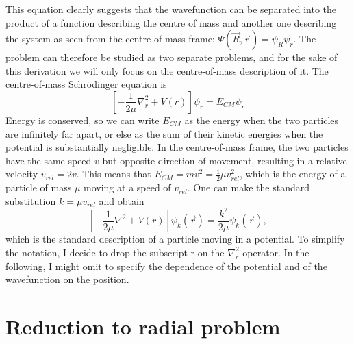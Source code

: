 This equation clearly suggests that the wavefunction can be separated into the product of a function describing the centre of mass and another one describing the system as seen from the centre-of-mass frame: \(\Psi (\vec{R},\vec{r}) = \psi_R \psi _r\). The problem can therefore be studied as two separate problems, and for the sake of this derivation we will only focus on the centre-of-mass description of it. The centre-of-mass Schrödinger equation is
\begin{equation}
	\left[- \frac{1}{2\mu }\nabla _r^2 + V(r)\right]\psi _r = E_{CM} \psi _r
\end{equation}
Energy is conserved, so we can write \(E_{CM} \) as the energy when the two particles are infinitely far apart, or else as the sum of their kinetic energies when the potential is substantially negligible. In the centre-of-mass frame, the two particles have the same speed \(v\) but opposite direction of movement, resulting in a relative velocity \(v_{rel} = 2v\). This means that \(E_{CM} = mv^2 = \frac{1}{2} \mu v_{rel}^2\), which is the energy of a particle of mass \(\mu \) moving at a speed of \(v_{rel} \). One can make the standard substitution \(k=\mu v_{rel} \) and obtain
\begin{equation}
	\left[- \frac{1}{2\mu } \nabla ^2 + V(r)\right] \psi _k (\vec{r}) = \frac{k^2}{2\mu } \psi _k (\vec{r}),
\end{equation}
which is the standard description of a particle moving in a potential. To simplify the notation, I decide to drop the subscript r on the \(\nabla _r ^2\) operator. In the following, I might omit to specify the dependence of the potential and of the wavefunction on the position.

\section{Reduction to radial problem}

